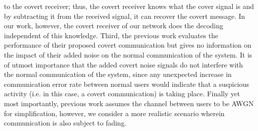to the covert receiver; thus, the covert receiver knows what the cover signal is and by subtracting it from the received signal, it can recover the covert message. In our work, however, the covert receiver of our network does the decoding independent of this knowledge. Third, the previous work evaluates the performance of their proposed covert communication but gives no information on the impact of their added noise on the normal communication of the system. It is of utmost importance that the added covert noise signals do not interfere with the normal communication of the system, since any unexpected increase in communication error rate between normal users would indicate that a suspicious activity (i.e. in this case, a covert communication) is taking place. Finally yet most importantly, previous work assumes the channel between users to be AWGN for simplification, however, we consider a more realistic scenario wherein communication is also subject to fading.